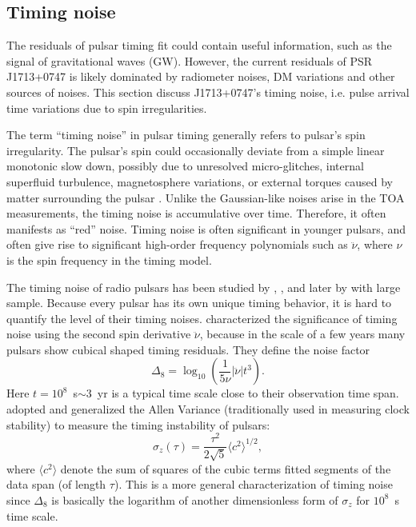 \subsection{Timing noise}
\label{sec:noise}
The residuals of pulsar timing fit could contain useful information,
such as the signal of gravitational waves (GW). However, the current residuals of PSR J1713+0747 is likely dominated by radiometer noises, DM variations and other
sources of noises. This section discuss J1713+0747's timing noise, i.e. pulse arrival time variations due to spin irregularities.


The term ``timing noise'' in pulsar timing generally refers to pulsar's spin irregularity.
The pulsar's spin could occasionally deviate from a simple linear monotonic slow down, possibly due to unresolved
micro-glitches, internal superfluid turbulence, magnetosphere variations, or external torques caused by matter surrounding the pulsar
\citep{hlk10, ymh+13, ml14}.
Unlike the Gaussian-like noises arise in the TOA measurements, the timing noise
is accumulative over time. Therefore, it often manifests as ``red'' 
noise. Timing noise is often significant in younger pulsars, and often give rise to significant high-order frequency polynomials such as $\ddot{\nu}$, where $\nu$ is the spin frequency in the timing model.

The timing noise of radio pulsars has been studied by \citet{antt94},
\citet{dmhd95}, \citet{mtem97} and later by \citet{hlk10} with large sample. 
Because every pulsar has its own unique timing behavior, it is
hard to quantify the level of their timing noises.
\citet{antt94} characterized the significance of timing noise using the second
spin derivative $\ddot{\nu}$, because in the scale of a few years many
pulsars show cubical shaped timing residuals. They define the noise factor 
\begin{equation}
\label{eq:delta8}
\Delta_8 = \log_{10}\left(\frac{1}{5\nu}|\ddot{\nu}|t^3\right).
\end{equation}
Here $t=10^8$~s$\sim 3$~yr is a typical time scale close to their
observation time span.
\citet{mtem97} adopted and generalized the Allen Variance (traditionally used in measuring clock stability) to measure the timing instability of pulsars:
\begin{equation}
\label{eq:sigmaz}
\sigma_z(\tau) = \frac{\tau^2}{2\sqrt{5}}\langle c^2 \rangle^{1/2},
\end{equation}
where $\langle c^2\rangle$ denote the sum of squares of the cubic terms fitted segments of
the data span (of length $\tau$).
This is a more general characterization of timing noise since $\Delta_8$ is
basically the logarithm of another dimensionless form of $\sigma_z$ for
$10^8$~s time scale.

